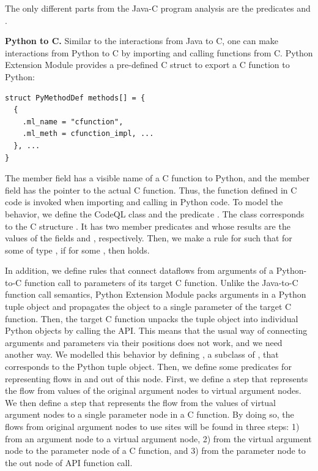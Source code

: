 \noindent
The only different parts from the Java-C program analysis are the predicates
 and .

\textbf{Python to C.} Similar to the interactions from Java to C, one can make
interactions from Python to C by importing and calling functions from C. Python
Extension Module provides a pre-defined C struct  to export
a C function to Python:

\begin{lstlisting}[style=mcpp]
struct PyMethodDef methods[] = {
  {
    .ml_name = "cfunction",
    .ml_meth = cfunction_impl, ...
  }, ...
}
\end{lstlisting}

\noindent
The member field  has a visible name of a C function to Python,
and the member field  has the pointer to the actual C function.
Thus, the function  defined in C code is invoked when
importing and calling  in Python code.  To model the behavior,
we define the CodeQL class  and the predicate
. The class  corresponds to the C
structure . It has two member predicates 
and  whose results are the values of the fields
 and , respectively.  Then, we make a rule for
 such that for some  of type
, if   for some , then   holds.

In addition, we define rules that connect dataflows from arguments of a
Python-to-C function call to parameters of its target C function.  Unlike the
Java-to-C function call semantics, Python Extension Module packs arguments in a
Python tuple object and propagates the object to a single parameter of the
target C function.  Then, the target C function unpacks the tuple object into
individual Python objects by calling the  API.  This
means that the usual way of connecting arguments and parameters via their
positions does not work, and we need another way.  We modelled this behavior by
defining , a subclass of , that corresponds
to the Python tuple object. Then, we define some predicates for representing
flows in and out of this node. First, we define a step that represents the flow
from values of the original argument nodes to virtual argument nodes. We then
define a step that represents the flow from the values of virtual argument
nodes to a single parameter node in a C function.  By doing so, the flows from
original argument nodes to use sites will be found in three steps: 1) from an
argument node to a virtual argument node, 2) from the virtual argument node to
the parameter node of a C function, and 3) from the parameter node to the out
node of  API function call.


